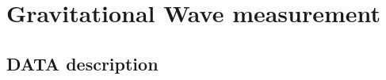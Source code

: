 \section{Gravitational Wave measurement} \label{sec:develop}
    
\subsection{\label{sec:level2} DATA description}
